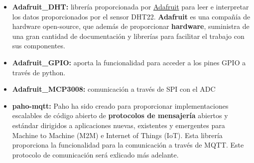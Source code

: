 \begin{itemize}  
\item \textbf{Adafruit\_DHT:} librería proporcionada por \href{https://www.adafruit.com/}{Adafruit} para leer e interpretar los datos proporcionados por el sensor DHT22. \textbf{Adafruit} es una compañía de hardware open-source, que además de proporcionar \textbf{hardware}, suministra de una gran cantidad de documentación y librerías para facilitar el trabajo con sus componentes. 
\item \textbf{Adafruit\_GPIO:} aporta la funcionalidad para acceder a los pines GPIO a través de python.
\item \textbf{Adafruit\_MCP3008:} comunicación a través de SPI con el ADC
\item \textbf{paho-mqtt:} Paho ha sido creado para proporcionar implementaciones escalables de código abierto de \textbf{protocolos de mensajería} abiertos y estándar dirigidos a aplicaciones nuevas, existentes y emergentes para Machine to Machine (M2M) e Internet of Things (IoT). Esta librería proporciona la funcionalidad para la comunicación a través de MQTT. Este protocolo de comunicación será exlicado más adelante.
\end{itemize}

